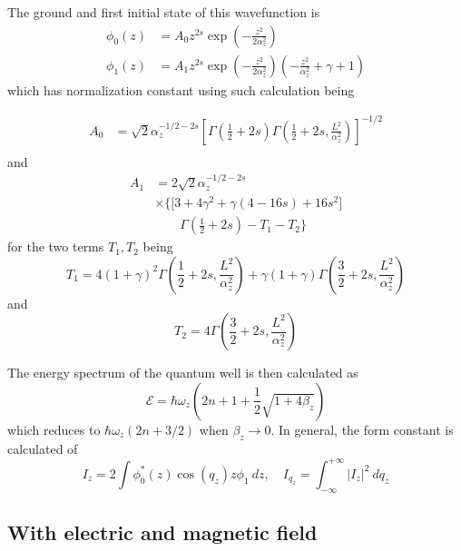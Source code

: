 \documentclass[%
 reprint,
 amsmath,amssymb,
 aps,
]{revtex4-2}
\begin{document}
The ground and first initial state of this wavefunction is 
\begin{align}
    \phi_{0}(z) & = A_{0}z^{2s}\exp{\left(-\frac{z^{2}}{2\alpha^{2}_{z}}\right)} \\
    \phi_{1}(z) & = A_{1} z^{2s}\exp{\left( -\frac{z^{2}}{2\alpha^{2}_{z}} \right)} \left(-\frac{z^{2}}{\alpha_{z}^{2}}+\gamma + 1\right)
\end{align}
which has normalization constant using such calculation being 

\begin{align}
    A_{0} & = \sqrt{2}\alpha_{z}^{-1/2-2s} \left[\Gamma \left(\frac{1}{2}+2s\right)\Gamma\left(\frac{1}{2}+2s, \frac{L^{2}}{\alpha_{z}^{2}}\right)\right]^{-1/2}\\
\end{align}
and 
\begin{equation}
    \begin{split}
        A_{1} & = 2\sqrt{2} \alpha_{z}^{-1/2-2s} \\
    & \times \Big\{ \Big[3+4\gamma^{2}+\gamma(4-16s)+16s^{2}\Big] \\
    &\quad \quad  \Gamma\left(\frac{1}{2}+2s\right)- T_{1} - T_{2}\Big\}
    \end{split}
\end{equation}
for the two terms $T_{1},T_{2}$ being
\begin{equation}
    T_{1} = 4(1+\gamma)^{2} \Gamma\left(\frac{1}{2}+2s, \frac{L^{2}}{\alpha_{z}^{2}}\right) + \gamma(1+\gamma) \Gamma \left(\frac{3}{2}+2s, \frac{L^{2}}{\alpha_{z}^{2}}\right)
\end{equation}
and 
\begin{equation}
    T_{2} = 4\Gamma \left(\frac{3}{2}+2s, \frac{L^{2}}{\alpha_{z}^{2}} \right)
\end{equation}

The energy spectrum of the quantum well is then calculated as 
\begin{equation}
    \mathcal{E} = \hbar \omega_{z} \left( 2n+1 + \frac{1}{2}\sqrt{1+4\beta_{z}} \right)
\end{equation}
which reduces to $\hbar\omega_{z}(2n+3/2)$ when $\beta_{z}\to 0$. In general, the form constant is calculated of 
\begin{equation}
    I_{z} = 2\int \phi^{*}_{0}(z)\cos{(q_{z})z}\phi_{1}\:dz, \quad I_{q_{z}} = \int_{-\infty}^{+\infty} \lvert I_{z}\rvert^{2} \: dq_{z}
\end{equation}
\subsection{With electric and magnetic field}
\end{document}
